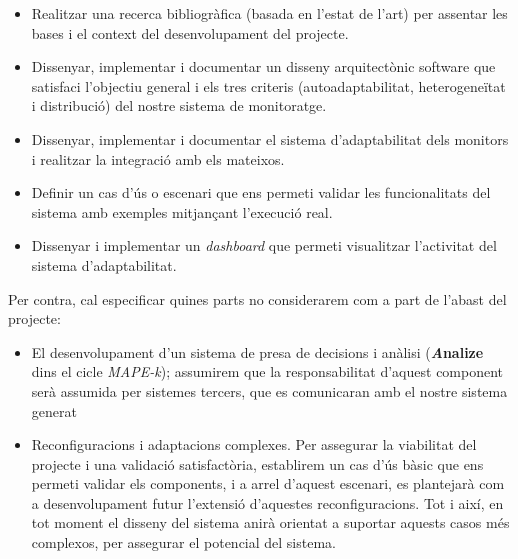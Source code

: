 \begin{itemize}
\item Realitzar una recerca bibliogràfica (basada en l’estat de l’art) per assentar les bases i el context del desenvolupament del projecte.
\item Dissenyar, implementar i documentar un disseny arquitectònic software que satisfaci l’objectiu general i els tres criteris (autoadaptabilitat, heterogeneïtat i distribució) del nostre sistema de monitoratge.
\item Dissenyar, implementar i documentar el sistema d'adaptabilitat dels monitors i realitzar la integració amb els mateixos.
\item Definir un cas d'ús o escenari que ens permeti validar les funcionalitats del sistema amb exemples mitjançant l'execució real.
\item Dissenyar i implementar un \textit{dashboard} que permeti visualitzar l'activitat del sistema d'adaptabilitat.
\end{itemize}

Per contra, cal especificar quines parts no considerarem com a part de l'abast del projecte:

\begin{itemize}
\item El desenvolupament d'un sistema de presa de decisions i anàlisi (\textbf{\textit{A}nalize} dins el cicle \textit{MAPE-k}); assumirem que la responsabilitat d'aquest component serà assumida per sistemes tercers, que es comunicaran amb el nostre sistema generat
\item Reconfiguracions i adaptacions complexes. Per assegurar la viabilitat del projecte i una validació satisfactòria, establirem un cas d'ús bàsic que ens permeti validar els components, i a arrel d'aquest escenari, es plantejarà com a desenvolupament futur l'extensió d'aquestes reconfiguracions. Tot i així, en tot moment el disseny del sistema anirà orientat a suportar aquests casos més complexos, per assegurar el potencial del sistema.
\end{itemize}